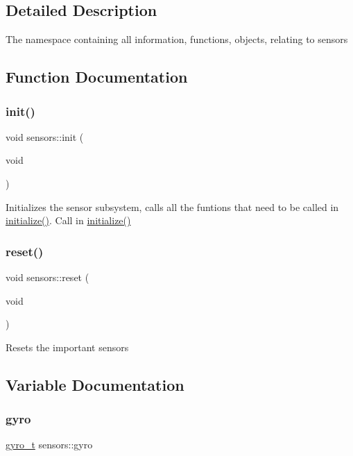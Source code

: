 \subsection{Detailed Description}
The namespace containing all information, functions, objects, relating to sensors 

\subsection{Function Documentation}
\mbox{\label{namespacesensors_a044693d89baff38c98f863ee503cde2e}} 
\subsubsection{\texorpdfstring{init()}{init()}}
{\footnotesize\ttfamily void sensors\+::init (\begin{DoxyParamCaption}\item[{void}]{ }\end{DoxyParamCaption})}

Initializes the sensor subsystem, calls all the funtions that need to be called in \hyperlink{main_8h_a25a40b6614565f755233080a384c35f1}{initialize()}. Call in \hyperlink{main_8h_a25a40b6614565f755233080a384c35f1}{initialize()} \mbox{\label{namespacesensors_a5d5bcadf00164a9db189d9bfa8d9dbb3}} 
\subsubsection{\texorpdfstring{reset()}{reset()}}
{\footnotesize\ttfamily void sensors\+::reset (\begin{DoxyParamCaption}\item[{void}]{ }\end{DoxyParamCaption})}

Resets the important sensors 

\subsection{Variable Documentation}
\mbox{\label{namespacesensors_a76c3057efa993dfa91cf8870ea7c99e0}} 
\subsubsection{\texorpdfstring{gyro}{gyro}}
{\footnotesize\ttfamily \hyperlink{classsensors_1_1gyro__t}{gyro\+\_\+t} sensors\+::gyro}


